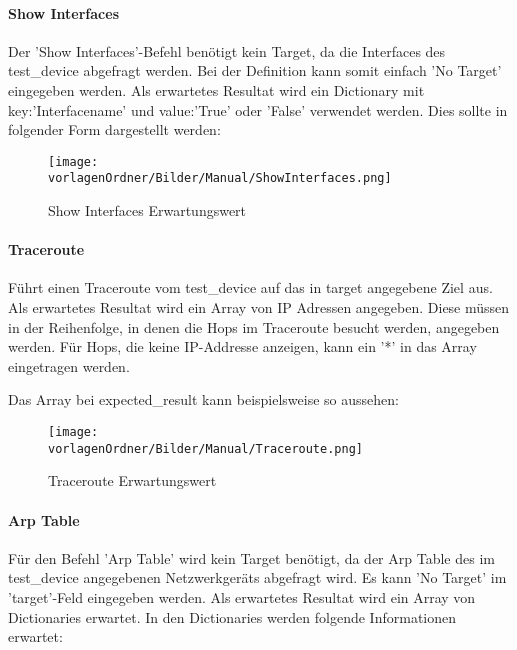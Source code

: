 \documentclass[]{subfiles}
\begin{document}
		\paragraph*{Show Interfaces}
			Der 'Show Interfaces'-Befehl benötigt kein Target, da die Interfaces des test\_device
			abgefragt werden. 
			Bei der Definition kann somit einfach 'No Target' eingegeben werden.
			Als erwartetes Resultat wird ein Dictionary mit key:'Interfacename' und 
			value:'True' oder 'False' verwendet werden.
			Dies sollte in folgender Form dargestellt werden:

			\begin{figure}[h!]
				\begin{center}
					\texttt{[image: \\vorlagenOrdner/Bilder/Manual/ShowInterfaces.png]}
					\caption{Show Interfaces Erwartungswert}
				\end{center}
			\end{figure}

		\paragraph*{Traceroute}
			Führt einen Traceroute vom test\_device auf das in target angegebene Ziel aus.
			Als erwartetes Resultat wird ein Array von IP Adressen angegeben.
			Diese müssen in der Reihenfolge, in denen die Hops im Traceroute besucht werden,
			angegeben werden. Für Hops, die keine IP-Addresse anzeigen, kann ein '*' in das
			Array eingetragen werden.

			Das Array bei expected\_result kann beispielsweise so aussehen:

			\begin{figure}[h!]
				\begin{center}
					\texttt{[image: \\vorlagenOrdner/Bilder/Manual/Traceroute.png]}
					\caption{Traceroute Erwartungswert}
				\end{center}
			\end{figure}

		\paragraph*{Arp Table}
			Für den Befehl 'Arp Table' wird kein Target benötigt, 
			da der Arp Table des im test\_device angegebenen Netzwerkgeräts abgefragt wird. 
			Es kann 'No Target' im 'target'-Feld eingegeben werden.
			Als erwartetes Resultat wird ein Array von Dictionaries erwartet. 
			In den Dictionaries werden folgende Informationen erwartet:
\end{document}
